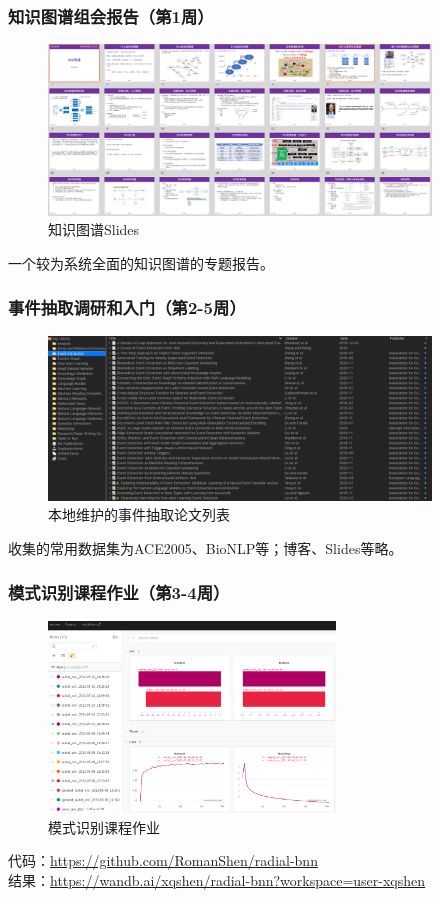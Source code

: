 \documentclass[10pt,aspectratio=43,mathserif]{beamer}
\begin{document}
		\begin{frame}
		  \frametitle{\textbf{知识图谱组会报告（第1周）}}
            \begin{figure}[!t]
            \centering
            \includegraphics[width=4in]{figures/kg.png}
            \caption{知识图谱Slides}
            \label{fig:kg}
            \end{figure}
            \centering 一个较为系统全面的知识图谱的专题报告。
		\end{frame}

		\begin{frame}
		  \frametitle{\textbf{事件抽取调研和入门（第2-5周）}}
            \begin{figure}[!t]
            \centering
            \includegraphics[width=4in]{figures/ee_papers.png}
            \caption{本地维护的事件抽取论文列表}
            \label{fig:ee}
            \end{figure}
            收集的常用数据集为ACE2005、BioNLP等；博客、Slides等略。
		\end{frame}

        \begin{frame}
		  \frametitle{\textbf{模式识别课程作业（第3-4周）}}
			\begin{figure}[!t]
            \centering
            \includegraphics[width=3in]{figures/pr.png}
            \caption{模式识别课程作业}
            \label{fig:pr}
            \end{figure}
            \centering \small {代码：\href{https://github.com/RomanShen/radial-bnn}{https://github.com/RomanShen/radial-bnn}\\
            结果：\href{https://wandb.ai/xqshen/radial-bnn?workspace=user-xqshen}{https://wandb.ai/xqshen/radial-bnn?workspace=user-xqshen}}
		\end{frame}
\end{document}
